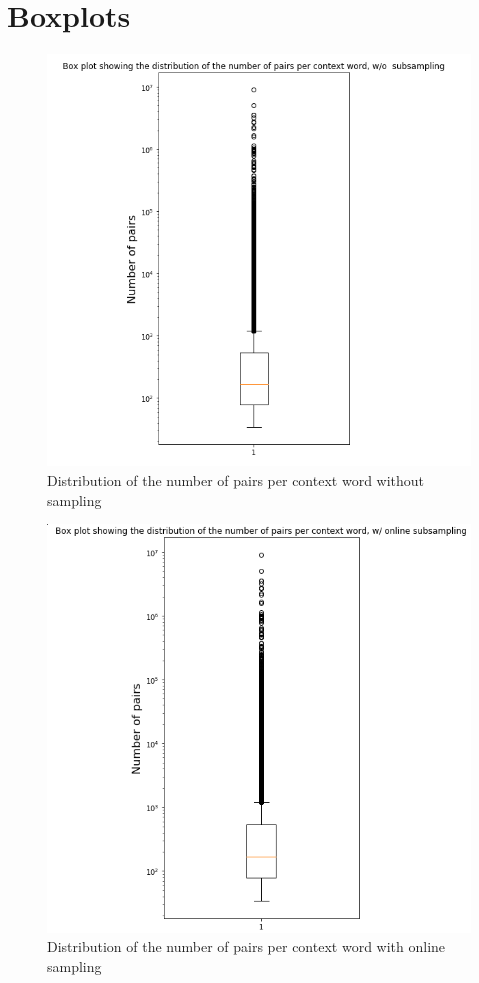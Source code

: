 \documentclass{scrartcl}
\begin{document}
\section{ Boxplots}
\begin{figure}[h!]
\caption{Distribution of the number of pairs per context word without sampling}
\includegraphics[scale=0.4]{no_sampling_boxplot}
\centering
\end{figure}

\begin{figure}[h!]
\caption{Distribution of the number of pairs per context word with online sampling}
\includegraphics[scale=0.4]{online_sampling_boxplot}
\centering
\end{figure}
\end{document}

